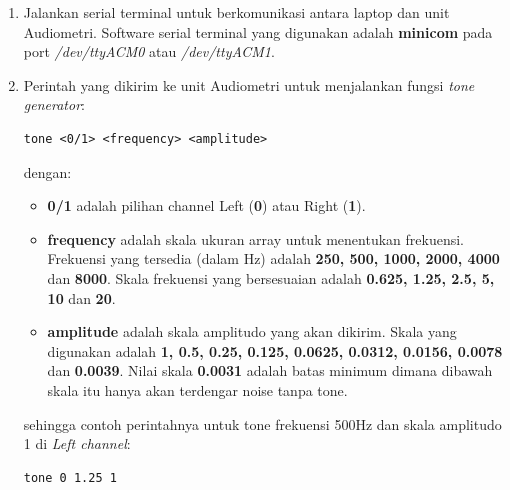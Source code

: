 \documentclass[12pt,]{article}
\begin{document}
\begin{enumerate}
		\newpage
		\item Jalankan serial terminal untuk berkomunikasi antara laptop dan unit Audiometri.
		Software serial terminal yang digunakan adalah \textbf{minicom} pada port \textit{/dev/ttyACM0} atau \textit{/dev/ttyACM1}.
		
		\item Perintah yang dikirim ke unit Audiometri untuk menjalankan fungsi \textit{tone generator}:
\begin{verbatim}
tone <0/1> <frequency> <amplitude>
\end{verbatim}
		dengan:
		\begin{itemize}
			\item \textbf{0/1} adalah pilihan channel Left (\textbf{0}) atau Right (\textbf{1}).
			
			\item \textbf{frequency} adalah skala ukuran array untuk menentukan frekuensi.
			Frekuensi yang tersedia (dalam Hz) adalah \textbf{250, 500, 1000, 2000, 4000} dan \textbf{8000}.
			Skala frekuensi yang bersesuaian adalah \textbf{0.625, 1.25, 2.5, 5, 10} dan \textbf{20}.
			
			\item \textbf{amplitude} adalah skala amplitudo yang akan dikirim.
			Skala yang digunakan adalah \textbf{1, 0.5, 0.25, 0.125, 0.0625, 0.0312, 0.0156, 0.0078} dan \textbf{0.0039}.
			Nilai skala \textbf{0.0031} adalah batas minimum dimana dibawah skala itu hanya akan terdengar noise tanpa tone.
		\end{itemize}
		
		sehingga contoh perintahnya untuk tone frekuensi 500Hz dan skala amplitudo 1 di \textit{Left channel}:
\begin{verbatim}
tone 0 1.25 1
\end{verbatim}


\end{enumerate}
\end{document}
